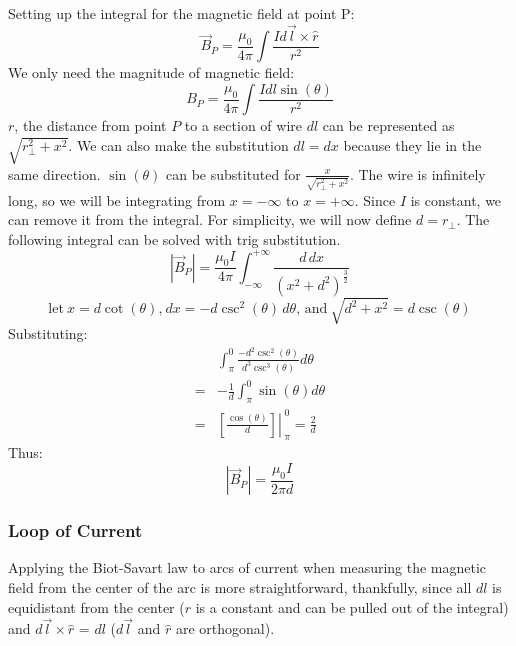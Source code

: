 \documentclass[12pt, titlepage]{article}
\begin{document}
Setting up the integral for the magnetic field at point P:
\begin{equation*}
    \vec{B}_P = \frac{\mu_0}{4\pi} \int \frac{Id\vec{l}\times\hat{r}}{r^2}
\end{equation*}
We only need the magnitude of magnetic field:
\begin{equation*}
    B_P = \frac{\mu_0}{4\pi} \int \frac{Idl\sin(\theta)}{r^2}
\end{equation*}
$r$, the distance from point $P$ to a section of wire $dl$ can be represented as $\sqrt{r_{\perp}^2+x^2}$. We can also make the substitution $dl=dx$ because they lie in the same direction. $\sin(\theta)$ can be substituted for $\frac{x}{\sqrt{r_{\perp}^2+x^2}}$. The wire is infinitely long, so we will be integrating from $x=-\infty$ to $x=+\infty$. Since $I$ is constant, we can remove it from the integral. For simplicity, we will now define $d=r_{\perp}$. The following integral can be solved with trig substitution.
\begin{equation*}
    |\vec{B}_P| = \frac{\mu_0I}{4\pi} \int_{-\infty}^{+\infty} \frac{d \, dx}{(x^2+d^2)^{\frac{3}{2}}}
\end{equation*}
\begin{equation*}
    \textrm{let} \ x=d\cot(\theta)\textrm{,} \ dx = -d\csc^2(\theta) \, d\theta\textrm{, and} \ \sqrt{d^2+x^2} = d\csc(\theta)
\end{equation*}
Substituting:
\begin{align*}
    &\int_{\pi}^{0} \frac{-d^2 \csc^2(\theta)}{d^3\csc^3(\theta)} d\theta \\
    =&-\frac{1}{d} \int_{\pi}^{0} \sin(\theta) d\theta \\
    =& \left.{\left [\frac{\cos(\theta)}{d}\right]}\right |_{\; \pi}^{\; 0}
    =\frac{2}{d}
\end{align*}
Thus:
\begin{equation*}
    \boxed{|\vec{B}_P|=\frac{\mu_0I}{2\pi d}}
\end{equation*}

\subsubsection*{Loop of Current}
Applying the Biot-Savart law to arcs of current when measuring the magnetic field from the center of the arc is more straightforward, thankfully, since all $dl$ is equidistant from the center ($r$ is a constant and can be pulled out of the integral) and $d\vec{l} \times \hat{r}$ = $dl$ ($d\vec{l}$ and $\hat{r}$ are orthogonal).
\end{document}
